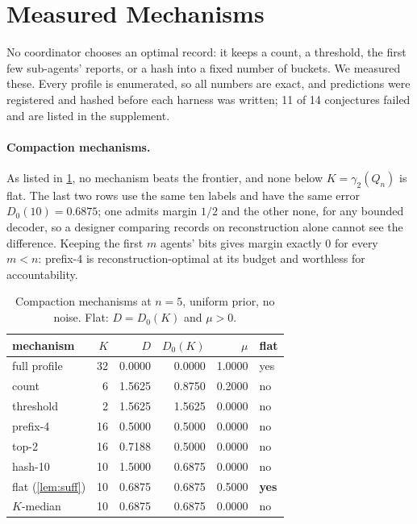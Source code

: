 \documentclass[sigconf,anonymous,acmthm=false]{aamas}
\theoremstyle{acmplain}
\theoremstyle{acmdefinition}
\begin{document}
\section{Measured Mechanisms}\label{sec:experiments}

No coordinator chooses an optimal record: it keeps a count, a threshold, the first few
sub-agents' reports, or a hash into a fixed number of buckets. We measured these. Every profile
is enumerated, so all numbers are exact, and predictions were registered and hashed before
each harness was written; 11 of 14 conjectures failed and are listed in the supplement.

\paragraph{Compaction mechanisms.} As listed in \cref{tab:mech}, no mechanism beats the
frontier, and none below $K=\gamma_2(Q_n)$ is flat. The last two rows use the same ten labels
and have the same error $D_0(10)=0.6875$; one admits margin $1/2$ and the other none, for any
bounded decoder, so a designer comparing records on reconstruction alone cannot see the
difference. Keeping the first $m$ agents' bits gives margin exactly 0 for every $m<n$: prefix-4
is reconstruction-optimal at its budget and worthless for accountability.

\begin{table}[t]
\caption{Compaction mechanisms at $n=5$, uniform prior, no noise. Flat: $D=D_0(K)$ and $\mu>0$.}
\label{tab:mech}
\footnotesize
\begin{tabular}{@{}lrrrrl@{}}
\toprule
mechanism & $K$ & $D$ & $D_0(K)$ & $\mu$ & flat\\
\midrule
full profile & 32 & 0.0000 & 0.0000 & 1.0000 & yes\\
count & 6 & 1.5625 & 0.8750 & 0.2000 & no\\
threshold & 2 & 1.5625 & 1.5625 & 0.0000 & no\\
prefix-4 & 16 & 0.5000 & 0.5000 & 0.0000 & no\\
top-2 & 16 & 0.7188 & 0.5000 & 0.0000 & no\\
hash-10 & 10 & 1.5000 & 0.6875 & 0.0000 & no\\
\midrule
flat (\cref{lem:suff}) & 10 & 0.6875 & 0.6875 & 0.5000 & \textbf{yes}\\
$K$-median & 10 & 0.6875 & 0.6875 & 0.0000 & no\\
\bottomrule
\end{tabular}
\end{table}
\end{document}
